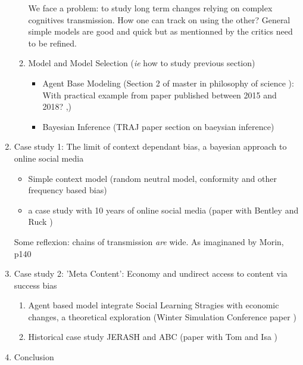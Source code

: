 \documentclass[a4paper]{article}
\begin{document}
\begin{enumerate}
\begin{enumerate}
                We face a problem: to study long term changes relying on complex cognitives transmission. How one can track on using the other? General simple models are good and quick but as mentionned by the critics need to be refined.
            \item Model and Model Selection (\emph{ie} how to study previous section)
                \begin{itemize}
                    \item Agent Base Modeling (Section 2 of master in philosophy of science \cite{carrignon2016modelandsimulaion}): 
                        \\ With practical example from paper published between 2015 and 2018? \cite{montanier2016behavioralspecializationinembodiedevolutionaryroboticswhysodifficult},\cite{zibetti2015acaciaesanagentbasedmodelingandsimulationtoolforinvestigatingsocialbehaviorsinresourcelimitedtwodimensionalenvironments}\cite{medernach2016evolution})
                    \item Bayesian Inference (TRAJ paper section on baeysian inference)
                \end{itemize}
        \end{enumerate}
    \item Case study 1: The limit of context dependant bias, a bayesian approach to online social media
        \begin{itemize}
            \item Simple context model (random neutral model, conformity and other frequency based bias)
            \item a case study with 10 years of online social media (paper with Bentley and Ruck \cite{carrignon2018})

        \end{itemize}
        Some reflexion: chains of transmission \emph{are} wide. As imaginaned by Morin, p140
    \item  Case study 2: 'Meta Content': Economy and undirect access to content via success bias
        \begin{enumerate}
            \item Agent based model integrate Social Learning Stragies with economic changes, a theoretical exploration (Winter Simulation Conference paper \cite{carrignon2015modelingthecoevolutionoftradeandcultureinpastsocieties})
            \item Historical case study JERASH and ABC (paper with Tom and Isa \cite{carrignon2018abmtrac})
        \end{enumerate}
    \item Conclusion
       
\end{enumerate}
\end{document}
